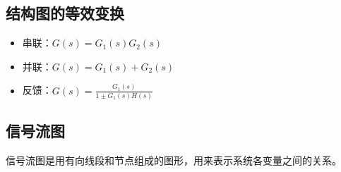 \subsection{结构图的等效变换}
\begin{itemize}
    \item 串联：$G(s) = G_1(s)G_2(s)$
    \item 并联：$G(s) = G_1(s) + G_2(s)$
    \item 反馈：$G(s) = \frac{G_1(s)}{1 \pm G_1(s)H(s)}$
\end{itemize}

\subsection{信号流图}
信号流图是用有向线段和节点组成的图形，用来表示系统各变量之间的关系。
